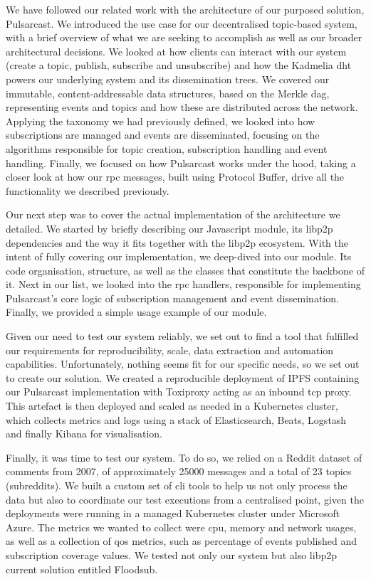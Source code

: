 We have followed our related work with the architecture of our purposed
solution, Pulsarcast. We introduced the use case for our decentralised
topic-based system, with a brief overview of what we are seeking to accomplish
as well as our broader architectural decisions. We looked at how clients can
interact with our system (create a topic, publish, subscribe and unsubscribe)
and how the Kadmelia \acrshort{dht} powers our underlying system and its
dissemination trees. We covered our immutable, content-addressable data
structures, based on the Merkle \acrshort{dag}, representing events and topics
and how these are distributed across the network. Applying the taxonomy we had
previously defined, we looked into how subscriptions are managed and events are
disseminated, focusing on the algorithms responsible for topic creation,
subscription handling and event handling. Finally, we focused on how Pulsarcast
works under the hood, taking a closer look at how our \acrshort{rpc} messages,
built using Protocol Buffer, drive all the functionality we described
previously.

Our next step was to cover the actual implementation of the architecture we
detailed. We started by briefly describing our Javascript module, its libp2p
dependencies and the way it fits together with the libp2p ecosystem. With the
intent of fully covering our implementation, we deep-dived into our module. Its
code organisation, structure, as well as the classes that constitute the
backbone of it. Next in our list, we looked into the \acrshort{rpc} handlers,
responsible for implementing Pulsarcast's core logic of subscription management
and event dissemination.  Finally, we provided a simple usage example of our
module.

Given our need to test our system reliably, we set out to find a tool that
fulfilled our requirements for reproducibility, scale, data extraction and
automation capabilities. Unfortunately, nothing seems fit for our specific
needs, so we set out to create our solution. We created a reproducible
deployment of IPFS containing our Pulsarcast implementation with Toxiproxy
acting as an inbound \acrshort{tcp} proxy. This artefact is then deployed and
scaled as needed in a Kubernetes cluster, which collects metrics and logs using
a stack of Elasticsearch, Beats, Logstash and finally Kibana for visualisation.

Finally, it was time to test our system. To do so, we relied on a Reddit
dataset of comments from 2007, of approximately 25000 messages and a total of
23 topics (subreddits). We built a custom set of \acrshort{cli} tools to help
us not only process the data but also to coordinate our test executions from a
centralised point, given the deployments were running in a managed Kubernetes
cluster under Microsoft Azure. The metrics we wanted to collect were
\acrshort{cpu}, memory and network usages, as well as a collection of
\acrshort{qos} metrics, such as percentage of events published and subscription
coverage values. We tested not only our system but also libp2p current solution
entitled Floodsub.

